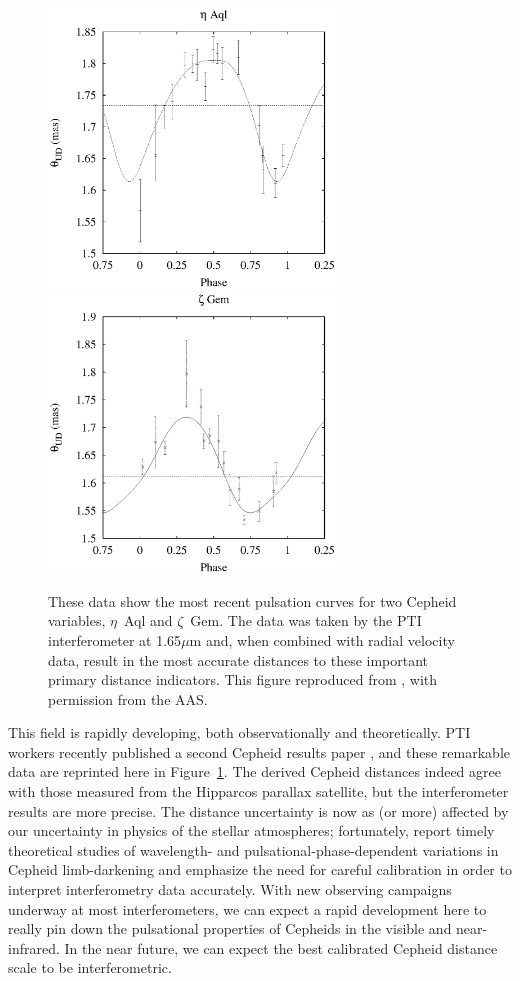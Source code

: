 \documentclass[12pt]{article}
\begin{document}
\begin{figure}[tbhp]
\begin{center}
\includegraphics[clip,angle=0,width=3.0in]{Figures/JDM_lane1a.eps}
\includegraphics[clip,angle=0,width=3.0in]{Figures/JDM_lane1b.eps}
\caption{\footnotesize 
These data show the most recent pulsation curves for
two Cepheid variables, $\eta$~Aql and $\zeta$~Gem.  
The data was taken by the PTI interferometer at 1.65$\mu$m
and, when  combined with radial velocity data, result in the most
accurate distances to these important primary distance indicators.
This figure reproduced from \citet[][see Figure 1]{lane2002a}, with
permission from the AAS.
\label{cepheids}}
\end{center}
\end{figure}

This field is rapidly developing, both observationally and
theoretically.  PTI workers recently published a second Cepheid
results paper \citep{lane2002a}, and these remarkable data are
reprinted here in Figure~\ref{cepheids}.  The derived Cepheid
distances indeed agree with those measured from the Hipparcos parallax
satellite, but the interferometer results are more precise.  The
distance uncertainty is now as (or more) affected by our uncertainty
in physics of the stellar atmospheres; fortunately,
\citet{marengo2002} report timely theoretical studies of wavelength-
and pulsational-phase-dependent variations in Cepheid limb-darkening
and emphasize the need for careful calibration in order to interpret
interferometry data accurately.  With new observing campaigns underway
at most interferometers, we can expect a rapid development here to
really pin down the pulsational properties of Cepheids in the visible
and near-infrared. In the near future, we can expect the best
calibrated Cepheid distance scale to be interferometric.
\end{document}
